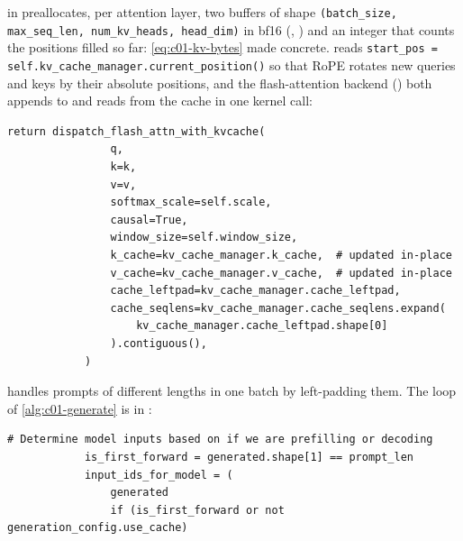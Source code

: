 \begin{implnote}[title={In the code: the KV cache and the generation loop in OLMo-core}]
 in
 preallocates,
per attention layer, two buffers of shape
\texttt{(batch\_size, max\_seq\_len, num\_kv\_heads, head\_dim)} in bf16 (,
) and an integer  that counts the positions filled so far:
\eqref{eq:c01-kv-bytes} made concrete.  reads
\texttt{start\_pos = self.kv\_cache\_manager.current\_position()} so that RoPE rotates new queries
and keys by their absolute positions, and the flash-attention backend
() both appends to
and reads from the cache in one kernel call:
\begin{lstlisting}[caption={Excerpt from \texttt{repos/\allowbreak allenai\_\_OLMo-core/\allowbreak src/\allowbreak olmo\_core/\allowbreak nn/\allowbreak attention/\allowbreak backend.py}},label={lst:c01-olmo-kvcache}]
            return dispatch_flash_attn_with_kvcache(
                q,
                k=k,
                v=v,
                softmax_scale=self.scale,
                causal=True,
                window_size=self.window_size,
                k_cache=kv_cache_manager.k_cache,  # updated in-place
                v_cache=kv_cache_manager.v_cache,  # updated in-place
                cache_leftpad=kv_cache_manager.cache_leftpad,
                cache_seqlens=kv_cache_manager.cache_seqlens.expand(
                    kv_cache_manager.cache_leftpad.shape[0]
                ).contiguous(),
            )
\end{lstlisting}
 handles prompts of different lengths in one batch by left-padding
them. The loop of \cref{alg:c01-generate} is  in
:
\begin{lstlisting}[caption={Excerpt from \texttt{repos/\allowbreak allenai\_\_OLMo-core/\allowbreak src/\allowbreak olmo\_core/\allowbreak generate/\allowbreak generation\_module/\allowbreak transformer/\allowbreak generation\_module.py}},label={lst:c01-olmo-generate}]
            # Determine model inputs based on if we are prefilling or decoding
            is_first_forward = generated.shape[1] == prompt_len
            input_ids_for_model = (
                generated
                if (is_first_forward or not generation_config.use_cache)

\end{lstlisting}
\end{implnote}
